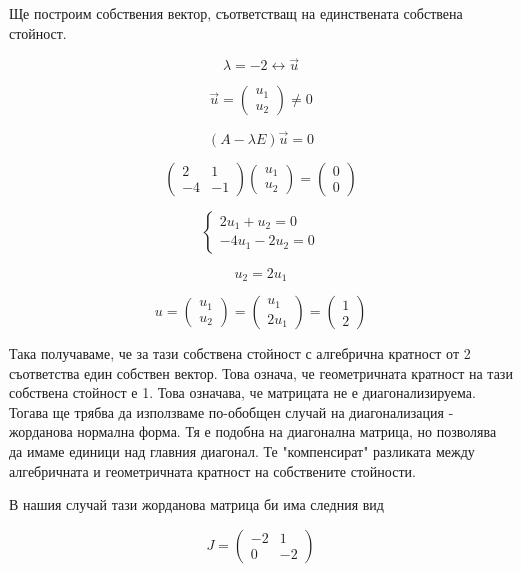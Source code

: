 \documentclass{scrartcl}
\begin{document}
Ще построим собствения вектор, съответстващ на единствената собствена стойност.

$$\lambda = -2 \longleftrightarrow \overrightarrow{u}$$

$$
\overrightarrow{u} =
\begin{pmatrix}
    u_1\\u_2
\end{pmatrix}
\ne 0
$$

$$(A-\lambda E)\overrightarrow{u} = 0$$

$$
\begin{pmatrix}
    2 & 1\\
    -4 & -1
\end{pmatrix}
\begin{pmatrix}
    u_1\\
    u_2
\end{pmatrix}
=
\begin{pmatrix}
    0\\
    0
\end{pmatrix}
$$

$$
\begin{cases}
    2u_1+u_2=0\\
    -4u_1-2u_2=0
\end{cases}
$$

$$u_2=2u_1$$

$$
u =
\begin{pmatrix}
    u_1\\u_2
\end{pmatrix}
=
\begin{pmatrix}
    u_1\\2u_1
\end{pmatrix}
=
\begin{pmatrix}
    1\\2
\end{pmatrix}
$$

Така получаваме, че за тази собствена стойност с алгебрична кратност от 2 съответства един собствен вектор. Това означа, че геометричната кратност на тази собствена стойност е 1. Това означава, че матрицата не е диагонализируема. Тогава ще трябва да използваме по-обобщен случай на диагонализация - жорданова нормална форма. Тя е подобна на диагонална матрица, но позволява да имаме единици над главния диагонал. Те "компенсират" разликата между алгебричната и геометричната кратност на собствените стойности.

В нашия случай тази жорданова матрица би има следния вид

$$
J =
\begin{pmatrix}
    -2 & 1\\ 0 &-2
\end{pmatrix}
$$
\end{document}

